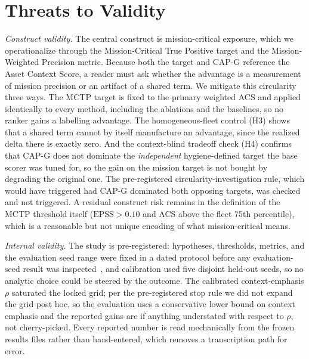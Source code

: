 \section{Threats to Validity}
\label{sec:threats}

\emph{Construct validity.} The central construct is mission-critical exposure, which we
operationalize through the Mission-Critical True Positive target and the Mission-Weighted
Precision metric. Because both the target and CAP-G reference the Asset Context Score, a reader
must ask whether the advantage is a measurement of mission precision or an artifact of a shared
term. We mitigate this circularity three ways. The MCTP target is fixed to the primary weighted
ACS and applied identically to every method, including the ablations and the baselines, so no
ranker gains a labelling advantage. The homogeneous-fleet control (H3) shows that a shared term
cannot by itself manufacture an advantage, since the realized delta there is exactly zero. And
the context-blind tradeoff check (H4) confirms that CAP-G does not dominate the
\emph{independent} hygiene-defined target the base scorer was tuned for, so the gain on the
mission target is not bought by degrading the original one. The pre-registered
circularity-investigation rule, which would have triggered had CAP-G dominated both opposing
targets, was checked and not triggered. A residual construct risk remains in the definition of
the MCTP threshold itself ($\mathrm{EPSS}>0.10$ and ACS above the fleet 75th percentile), which
is a reasonable but not unique encoding of what mission-critical means.

\emph{Internal validity.} The study is pre-registered: hypotheses, thresholds, metrics, and the
evaluation seed range were fixed in a dated protocol before any evaluation-seed result was
inspected~\cite{wohlin2012experimentation}, and calibration used five disjoint held-out seeds, so
no analytic choice could be steered by the outcome. The calibrated context-emphasis $\rho$
saturated the locked grid; per the pre-registered stop rule we did not expand the grid post hoc,
so the evaluation uses a conservative lower bound on context emphasis and the reported gains are
if anything understated with respect to $\rho$, not cherry-picked. Every reported number is read
mechanically from the frozen results files rather than hand-entered, which removes a transcription
path for error.

